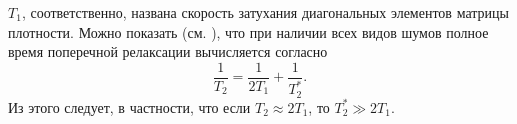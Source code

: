\documentclass[a4paper,12pt]{article}
\theoremstyle{plain} %
\theoremstyle{definition} %
\theoremstyle{remark} %
\begin{document}
$T_1$, соответственно, названа скорость затухания диагональных элементов матрицы плотности. Можно показать (см. \cite{t1t2}), что при наличии всех видов шумов полное время поперечной релаксации вычисляется согласно
\begin{equation}
    \frac{1}{T_2} = \frac{1}{2 T_1} + \frac{1}{T_2^*}.
\end{equation}
Из этого следует, в частности, что если $T_2 \approx 2 T_1$, то $T_2^* \gg 2 T_1$.

\pagebreak



\end{document}
